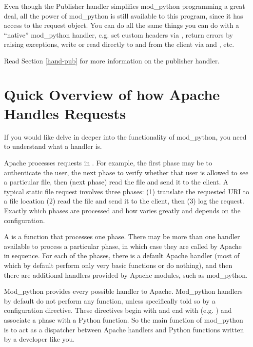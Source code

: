 Even though the Publisher handler simplifies mod_python programming a
great deal, all the power of mod_python is still available to this
program, since it has access to the request object. You can do all the
same things you can do with a ``native'' mod_python handler, e.g. set
custom headers via , return errors by raising
 exceptions, write or read directly to
and from the client via  and ,
etc.

Read Section \ref{hand-pub} 
for more information on the publisher handler. 

\section{Quick Overview of how Apache Handles Requests\label{tut-overview}}

If you would like delve in deeper into the functionality of
mod_python, you need to understand what a handler is.  

Apache processes requests in . For example, the first
phase may be to authenticate the user, the next phase to verify
whether that user is allowed to see a particular file, then (next
phase) read the file and send it to the client. A typical static file
request involves three phases: (1) translate the requested URI to a
file location (2) read the file and send it to the client, then (3)
log the request. Exactly which phases are processed and how varies
greatly and depends on the configuration.

A  is a function that processes one phase. There may be
more than one handler available to process a particular phase, in
which case they are called by Apache in sequence. For each of the
phases, there is a default Apache handler (most of which by default
perform only very basic functions or do nothing), and then there are
additional handlers provided by Apache modules, such as mod_python.

Mod_python provides every possible handler to Apache. Mod_python
handlers by default do not perform any function, unless specifically
told so by a configuration directive. These directives begin with
 and end with 
(e.g. ) and associate a phase with a Python
function. So the main function of mod_python is to act as a dispatcher
between Apache handlers and Python functions written by a developer
like you.


